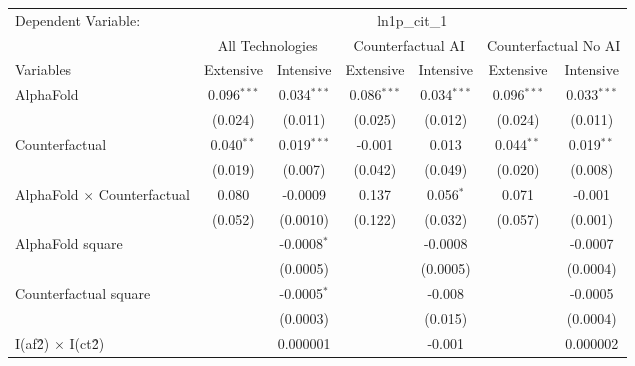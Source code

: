 \begingroup
\centering
\begin{tabular}{lcccccc}
   \tabularnewline \midrule \midrule
   Dependent Variable: & \multicolumn{6}{c}{ln1p\_cit\_1}\\
 & \multicolumn{2}{c}{All Technologies} & \multicolumn{2}{c}{Counterfactual AI} & \multicolumn{2}{c}{Counterfactual No AI} \\
\cmidrule(lr){1-1}\cmidrule(lr){2-3} \cmidrule(lr){4-5} \cmidrule(lr){6-7}
Variables & \multicolumn{1}{c}{Extensive} & \multicolumn{1}{c}{Intensive} & \multicolumn{1}{c}{Extensive} & \multicolumn{1}{c}{Intensive} & \multicolumn{1}{c}{Extensive} & \multicolumn{1}{c}{Intensive} \\
\cmidrule(lr){1-1}\cmidrule(lr){2-2} \cmidrule(lr){3-3} \cmidrule(lr){4-4} \cmidrule(lr){5-5} \cmidrule(lr){6-6} \cmidrule(lr){7-7}
   AlphaFold                          & 0.096$^{***}$ & 0.034$^{***}$ & 0.086$^{***}$ & 0.034$^{***}$ & 0.096$^{***}$ & 0.033$^{***}$\\   
                                      & (0.024)       & (0.011)       & (0.025)       & (0.012)       & (0.024)       & (0.011)\\   
   Counterfactual                     & 0.040$^{**}$  & 0.019$^{***}$ & -0.001        & 0.013         & 0.044$^{**}$  & 0.019$^{**}$\\   
                                      & (0.019)       & (0.007)       & (0.042)       & (0.049)       & (0.020)       & (0.008)\\   
   AlphaFold $\times$ Counterfactual  & 0.080         & -0.0009       & 0.137         & 0.056$^{*}$   & 0.071         & -0.001\\   
                                      & (0.052)       & (0.0010)      & (0.122)       & (0.032)       & (0.057)       & (0.001)\\   
   AlphaFold square                   &               & -0.0008$^{*}$ &               & -0.0008       &               & -0.0007\\   
                                      &               & (0.0005)      &               & (0.0005)      &               & (0.0004)\\   
   Counterfactual square              &               & -0.0005$^{*}$ &               & -0.008        &               & -0.0005\\   
                                      &               & (0.0003)      &               & (0.015)       &               & (0.0004)\\   
   I(af\^2) $\times$ I(ct\^2)         &               & 0.000001      &               & -0.001        &               & 0.000002\\   

\end{tabular}
